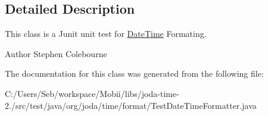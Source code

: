 \subsection{Detailed Description}
This class is a Junit unit test for \hyperlink{classorg_1_1joda_1_1time_1_1_date_time}{Date\-Time} Formating.

\begin{DoxyAuthor}{Author}
Stephen Colebourne 
\end{DoxyAuthor}


The documentation for this class was generated from the following file\-:\begin{DoxyCompactItemize}
\item 
C\-:/\-Users/\-Seb/workspace/\-Mobii/libs/joda-\/time-\/2./src/test/java/org/joda/time/format/Test\-Date\-Time\-Formatter.\-java\end{DoxyCompactItemize}
